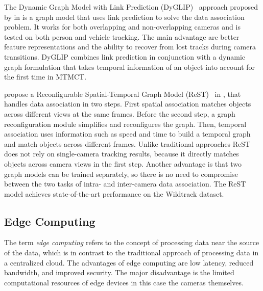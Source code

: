 The Dynamic Graph Model with Link Prediction (DyGLIP)~\cite{Quach21} approach proposed by \citeauthor{Quach21} in \citeyear{Quach21} is a graph model that uses link prediction to solve the data association problem. It works for both overlapping and non-overlapping cameras and is tested on both person and vehicle tracking. The main advantage are better feature representations and the ability to recover from lost tracks during camera transitions. DyGLIP combines link prediction in conjunction with a dynamic graph formulation that takes temporal information of an object into account for the first time in MTMCT.

\citeauthor{Cheng23} propose a Reconfigurable Spatial-Temporal Graph Model (ReST)~\cite{Cheng23} in \citeyear{Cheng23}, that handles data association in two steps. First spatial association matches objects across different views at the same frames. Before the second step, a graph reconfiguration module simplifies and reconfigures the graph. Then, temporal association uses information such as speed and time to build a temporal graph and match objects across different frames. Unlike traditional approaches ReST does not rely on single-camera tracking results, because it directly matches objects across camera views in the first step. Another advantage is that two graph models can be trained separately, so there is no need to compromise between the two tasks of intra- and inter-camera data association. The ReST model achieves state-of-the-art performance on the Wildtrack dataset.


\subsection{Edge Computing}\label{subsec:edge_computing}
The term \textit{edge computing} refers to the concept of processing data near the source of the data, which is in contrast to the traditional approach of processing data in a centralized cloud. The advantages of edge computing are low latency, reduced bandwidth, and improved security. The major disadvantage is the limited computational resources of edge devices in this case the cameras themselves.

